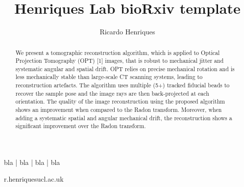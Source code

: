 \documentclass[times, twoside, watermark]{zHenriquesLab-StyleBioRxiv}
\begin{document}
\title{Henriques Lab bioRxiv template}

\author[1,\Letter]{Ricardo Henriques}


\maketitle

\begin{abstract}
\blindtext
\end {abstract}

\begin{keywords}
bla | bla | bla | bla
\end{keywords}

\begin{corrauthor}
r.henriques\at ucl.ac.uk
\end{corrauthor}
\begin{abstract}
  We present a tomographic reconstruction algorithm, which is applied to Optical Projection Tomography (OPT) [1] images, that is robust to mechanical jitter and systematic angular and spatial drift.
  OPT relies on precise mechanical rotation and is less mechanically stable than large-scale CT scanning systems, leading to reconstruction artefacts.
  The algorithm uses multiple (5+) tracked fiducial beads to recover the sample pose and the image rays are then back-projected at each orientation.
  The quality of the image reconstruction using the proposed algorithm shows an improvement when compared to the Radon transform.
  Moreover, when adding a systematic spatial and angular mechanical drift, the reconstruction shows a significant improvement over the Radon transform.
\end{abstract}


\end{document}
